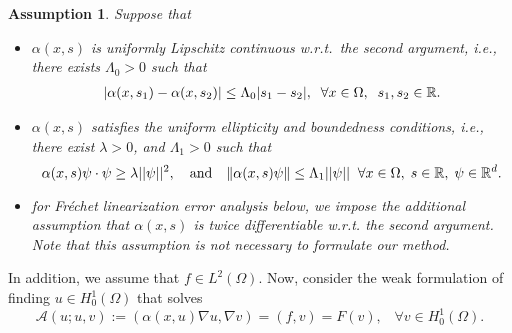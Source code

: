 \documentclass{article}
\newtheorem{assumption}{Assumption}
\begin{document}
\begin{assumption}\label{assum_1} Suppose that

\begin{itemize}
    \item $\alpha(x,s)$ is uniformly Lipschitz continuous w.r.t.~the second argument, i.e., there exists  $\Lambda_0 >0$ such that 
    \begin{equation}
       \begin{split}
       \abs{\alpha(x, s_1)-\alpha(x,s_2)}\leq \Lambda_0 \abs{s_1-s_2} ,   \;  \;\forall x \in \Omega, \; \; s_1, s_2 \in \mathbb{R}.
       \end{split}
    \end{equation}
  
    \item $\alpha(x,s)$ satisfies the uniform ellipticity and boundedness conditions, i.e., there exist $\lambda >0$, and $\Lambda_1>0$ such that
    \begin{equation}\label{ellip}
                  {\alpha(x, s)\psi\cdot\psi} \geq \lambda |\abs{\psi}|^2, \quad \text{and} \quad \|\alpha(x,s)\psi\|\leq \Lambda _1 |\abs{\psi}| \;\; \forall  x \in \Omega , \;s \in \mathbb{R}, \;  \psi \in \mathbb{R}^d.
    \end{equation}
 
   \item for Fréchet linearization error analysis below, we impose the additional assumption that $\alpha(x,s)$ is twice differentiable w.r.t. the second argument. Note that this assumption is not necessary to formulate our method.
\end{itemize}
\end{assumption}
In addition, we assume that $f \in L^2(\Omega)$. Now, consider the weak formulation of finding $u \in H_0^1(\Omega)$ that solves
\begin{equation}\label{WeakForm}
    \mathcal{A}(u;u,v) :=(\alpha(x,u)\nabla u,\nabla v) =(f,v)=F(v) ,  \;\;\; \forall  v  \in H^1_0(\Omega).
\end{equation}
 
\end{document}
